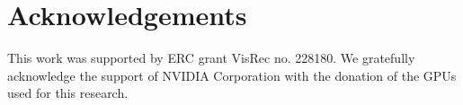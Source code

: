 \documentclass{article} %
\begin{document}
\section*{Acknowledgements}
This work was supported by ERC grant VisRec no. 228180. 
We gratefully acknowledge the support of NVIDIA Corporation with the donation of the GPUs used for this research.


{
    \small
    
}
\end{document}
